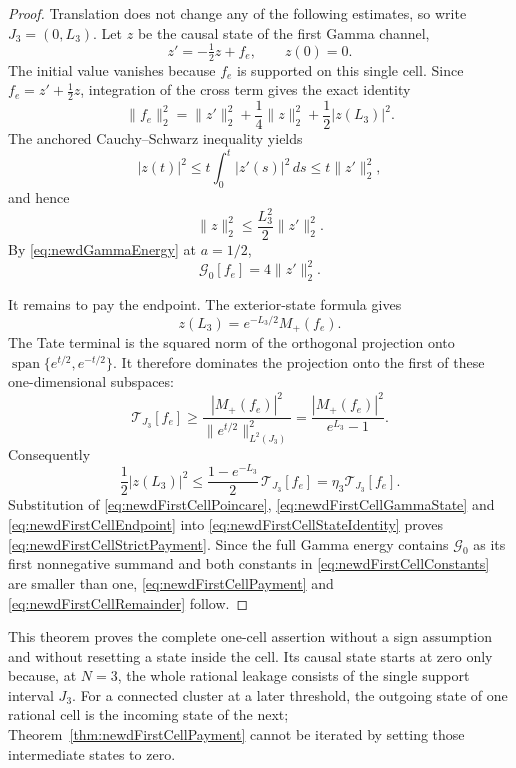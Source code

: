 \begin{proof}
Translation does not change any of the following estimates, so write
$J_3=(0,L_3)$.  Let $z$ be the causal state of the first Gamma channel,
\[
 z'=-\tfrac12z+f_e,
 \qquad z(0)=0.
\]
The initial value vanishes because $f_e$ is supported on this single cell.
Since $f_e=z'+\tfrac12z$, integration of the cross term gives the exact
identity
\begin{equation}\label{eq:newdFirstCellStateIdentity}
 \|f_e\|_2^2
 =\|z'\|_2^2+\frac14\|z\|_2^2+\frac12|z(L_3)|^2.
\end{equation}
The anchored Cauchy--Schwarz inequality yields
\[
 |z(t)|^2
 \leq t\int_0^t|z'(s)|^2\,ds
 \leq t\|z'\|_2^2,
\]
and hence
\begin{equation}\label{eq:newdFirstCellPoincare}
 \|z\|_2^2\leq\frac{L_3^2}{2}\|z'\|_2^2.
\end{equation}
By \eqref{eq:newdGammaEnergy} at $a=1/2$,
\begin{equation}\label{eq:newdFirstCellGammaState}
 \mathcal G_0[f_e]=4\|z'\|_2^2.
\end{equation}

It remains to pay the endpoint.  The exterior-state formula gives
\[
 z(L_3)=e^{-L_3/2}M_+(f_e).
\]
The Tate terminal is the squared norm of the orthogonal projection onto
$\operatorname{span}\{e^{t/2},e^{-t/2}\}$.  It therefore dominates the
projection onto the first of these one-dimensional subspaces:
\begin{equation}\label{eq:newdFirstCellTateProjection}
 \mathcal T_{J_3}[f_e]
 \geq\frac{|M_+(f_e)|^2}{\|e^{t/2}\|_{L^2(J_3)}^2}
 =\frac{|M_+(f_e)|^2}{e^{L_3}-1}.
\end{equation}
Consequently
\begin{equation}\label{eq:newdFirstCellEndpoint}
 \frac12|z(L_3)|^2
 \leq\frac{1-e^{-L_3}}2\,\mathcal T_{J_3}[f_e]
 =\eta_3\mathcal T_{J_3}[f_e].
\end{equation}
Substitution of \eqref{eq:newdFirstCellPoincare},
\eqref{eq:newdFirstCellGammaState} and
\eqref{eq:newdFirstCellEndpoint} into
\eqref{eq:newdFirstCellStateIdentity} proves
\eqref{eq:newdFirstCellStrictPayment}.  Since the full Gamma energy contains
$\mathcal G_0$ as its first nonnegative summand and both constants in
\eqref{eq:newdFirstCellConstants} are smaller than one,
\eqref{eq:newdFirstCellPayment} and
\eqref{eq:newdFirstCellRemainder} follow.
\end{proof}

This theorem proves the complete one-cell assertion without a sign
assumption and without resetting a state inside the cell.  Its causal state
starts at zero only because, at $N=3$, the whole rational leakage consists
of the single support interval $J_3$.  For a connected cluster at a later
threshold, the outgoing state of one rational cell is the incoming state of
the next; Theorem~\ref{thm:newdFirstCellPayment} cannot be iterated by
setting those intermediate states to zero.

